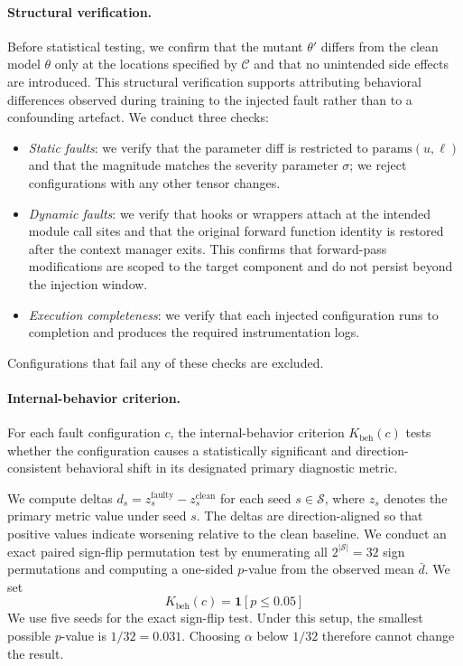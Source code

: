 \paragraph{Structural verification.}
Before statistical testing, we confirm that the mutant $\theta'$ differs from the clean model $\theta$ only at the locations specified by $\mathcal{C}$ and that no unintended side effects are introduced. This structural verification supports attributing behavioral differences observed during training to the injected fault rather than to a confounding artefact. We conduct three checks:
\begin{itemize}[nosep]
\item \emph{Static faults}: we verify that the parameter diff is restricted to $\mathrm{params}(u,\ell)$ and that the magnitude matches the severity parameter $\sigma$; we reject configurations with any other tensor changes.
\item \emph{Dynamic faults}: we verify that hooks or wrappers attach at the intended module call sites and that the original forward function identity is restored after the context manager exits. This confirms that forward-pass modifications are scoped to the target component and do not persist beyond the injection window.
\item \emph{Execution completeness}: we verify that each injected configuration runs to completion and produces the required instrumentation logs.
\end{itemize}
Configurations that fail any of these checks are excluded.

\paragraph{Internal-behavior criterion.}

For each fault configuration $c$, the internal-behavior criterion $K_{\text{beh}}(c)$ tests whether the configuration causes a statistically significant and direction-consistent behavioral shift in its designated primary diagnostic metric.

We compute deltas $d_s = z_s^{\text{faulty}} - z_s^{\text{clean}}$ for each seed $s \in \mathcal{S}$, where $z_s$ denotes the primary metric value under seed $s$. The deltas are direction-aligned so that positive values indicate worsening relative to the clean baseline. We conduct an exact paired sign-flip permutation test by enumerating all $2^{|\mathcal{S}|} = 32$ sign permutations and computing a one-sided $p$-value from the observed mean $\bar{d}$. We set
\begin{equation}
K_{\text{beh}}(c) = \mathbf{1}[p \le 0.05]
\label{eq:k-beh}
\end{equation}
We use five seeds for the exact sign-flip test. Under this setup, the smallest possible $p$-value is $1/32 = 0.031$. Choosing $\alpha$ below $1/32$ therefore cannot change the result.

